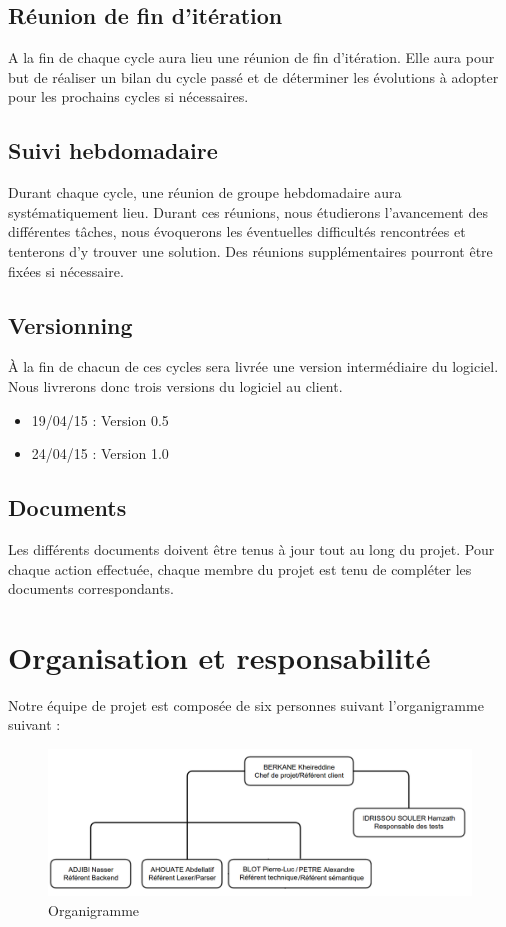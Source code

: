 \documentclass{../res/univ-projet}
\begin{document}
  \subsection{Réunion de fin d’itération}
    A la fin de chaque cycle aura lieu une réunion de fin d’itération. Elle aura pour but de réaliser un bilan du cycle passé et de déterminer les évolutions à adopter pour les prochains cycles si nécessaires.
  \subsection{Suivi hebdomadaire}
    Durant chaque cycle, une réunion de groupe hebdomadaire aura systématiquement lieu. Durant ces réunions, nous étudierons l’avancement des différentes tâches, nous évoquerons les éventuelles difficultés rencontrées et tenterons d’y trouver une solution. Des réunions supplémentaires pourront être fixées si nécessaire.
  \subsection{Versionning}
    À la fin de chacun de ces cycles sera livrée une version intermédiaire du logiciel. Nous livrerons donc trois versions du logiciel au client.
    \begin{itemize}
      \item 19/04/15 : Version 0.5
      \item 24/04/15 : Version 1.0
    \end{itemize}
  \subsection{Documents}
    Les différents documents doivent être tenus à jour tout au long du projet. Pour chaque action effectuée, chaque membre du projet est tenu de compléter les documents correspondants.
  \newpage
\section{Organisation et responsabilité}
Notre équipe de projet est composée de six personnes suivant l’organigramme suivant :
 \begin{figure}[!h]
    \includegraphics[width=17.8cm]{fig/organigramme-v2.png}
    \caption{Organigramme}
    \label{organigramme}
  \end{figure}
\end{document}
